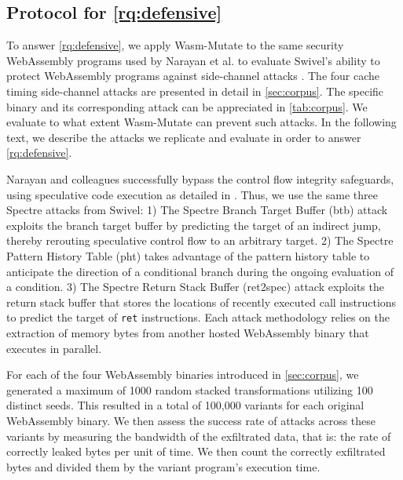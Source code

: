 \documentclass[a4paper,fleqn]{cas-dc}
\newcommand*\badge[1]{ \colorbox{red}{\color{white}#1}}
\newcommand{\tool}{{\sc Wasm-Mutate}\xspace}
\newcommand{\Wasm}{WebAssembly\xspace}
\newcommand{\wasm}{\Wasm}
\newcommand{\todo}[1]{%
\refstepcounter{todo}
\noindent\textbf{\badge{TODO}} {\color{red}#1}
\addcontentsline{td}{todo}
{\color{red}\thesection.\thetodo\xspace #1}}
\begin{document}
\subsection{Protocol for \ref{rq:defensive}}
\label{protocol:rq3}

\newcommand{\poct}{\emph{Cache timing POC}\xspace}
\newcommand{\pocd}{\emph{Differential computing POC}\xspace}
\newcommand{\pocp}{\emph{Port contention POC}\xspace}

To answer \ref{rq:defensive}, we apply \tool to the same security \wasm programs used by Narayan et al. to evaluate Swivel's ability to protect \wasm programs against side-channel attacks \cite{Swivel}. 
The four cache timing side-channel attacks are presented in detail in \autoref{sec:corpus}. 
The specific binary and its corresponding attack can be appreciated in \autoref{tab:corpus}.
We evaluate to what extent \tool can prevent such attacks.
In the following text, we describe the attacks we replicate and evaluate in order to answer \ref{rq:defensive}.


Narayan and colleagues successfully bypass the control flow integrity safeguards, using speculative code execution as detailed in \cite{Spectre}. 
Thus, we use the same three Spectre attacks from Swivel:
1) The Spectre Branch Target Buffer (btb) attack exploits the branch target buffer by predicting the target of an indirect jump, thereby rerouting speculative control flow to an arbitrary target.
2) The Spectre Pattern History Table (pht) takes advantage of the pattern history table to anticipate the direction of a conditional branch during the ongoing evaluation of a condition. 
3) The Spectre Return Stack Buffer (ret2spec) attack exploits the return stack buffer that stores the locations of recently executed call instructions to predict the target of \texttt{ret} instructions. 
Each attack methodology relies on the extraction of memory bytes from another hosted \wasm binary that executes in parallel.


For each of the four \wasm binaries introduced in \autoref{sec:corpus}, we generated a maximum of 1000 random stacked transformations utilizing 100 distinct seeds. 
This resulted in a total of 100,000 variants for each original \wasm binary.
We then assess the success rate of attacks across these variants by measuring the bandwidth of the exfiltrated data, that is: the rate of correctly leaked bytes per unit of time. 
We then count the correctly exfiltrated bytes and divided them by the variant program's execution time. 
\end{document}
